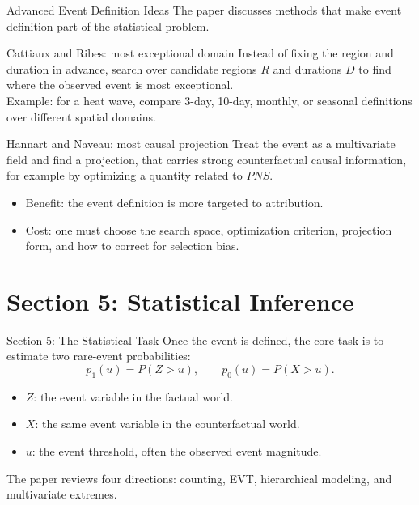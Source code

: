 \documentclass[aspectratio=169]{beamer}
\begin{document}
\begin{frame}{Advanced Event Definition Ideas}
  \small
  The paper discusses methods that make event definition part of the statistical problem.

  \begin{block}{Cattiaux and Ribes: most exceptional domain}
    Instead of fixing the region and duration in advance, search over candidate
    regions $R$ and durations $D$ to find where the observed event is most
    exceptional. \\
    
    Example: for a heat wave, compare 3-day, 10-day, monthly, or
    seasonal definitions over different spatial domains.
  \end{block}

  \begin{block}{Hannart and Naveau: most causal projection}
    Treat the event as a multivariate field and find a projection, that carries strong counterfactual causal information, for
    example by optimizing a quantity related to $PNS$.
  \end{block}

  \vspace{-0.05cm}
  \begin{itemize}
    \item Benefit: the event definition is more targeted to attribution.
    \item Cost: one must choose the search space, optimization criterion,
    projection form, and how to correct for selection bias.
  \end{itemize}
\end{frame}

\section{Section 5: Statistical Inference}

\begin{frame}{Section 5: The Statistical Task}
  Once the event is defined, the core task is to estimate two rare-event probabilities:
  \[
    p_1(u)=P(Z>u), \qquad p_0(u)=P(X>u).
  \]

  \vspace{0.15cm}
  \begin{itemize}
    \item $Z$: the event variable in the factual world.
    \item $X$: the same event variable in the counterfactual world.
    \item $u$: the event threshold, often the observed event magnitude.
  \end{itemize}

  \vspace{0.15cm}
  The paper reviews four directions: counting, EVT, hierarchical modeling, and multivariate extremes.
\end{frame}
\end{document}
